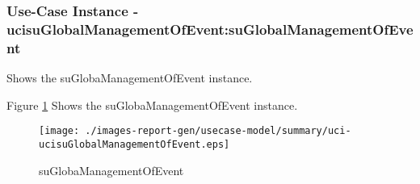 
	\subsubsection{Use-Case Instance - ucisuGlobalManagementOfEvent:suGlobalManagementOfEvent}
	
	Shows the suGlobaManagementOfEvent instance.		  
	\begin{operationmodel}
	
	\end{operationmodel} 

	
	Figure \ref{fig:lu.uni.lassy.excalibur.group09.spec-RE-UC-uci-ucisuGlobalManagementOfEvent}
	Shows the suGlobaManagementOfEvent instance.
	
	\begin{figure}[htbp]
	\begin{center}
	
	\texttt{[image: ./images-report-gen/usecase-model/summary/uci-ucisuGlobalManagementOfEvent.eps]}
	\end{center}
	\caption[lu.uni.lassy.excalibur.group09.spec Sequence Diagram: uci-ucisuGlobalManagementOfEvent]{suGlobaManagementOfEvent}
	\label{fig:lu.uni.lassy.excalibur.group09.spec-RE-UC-uci-ucisuGlobalManagementOfEvent}
	\end{figure}
	\vspace{0.5cm}
